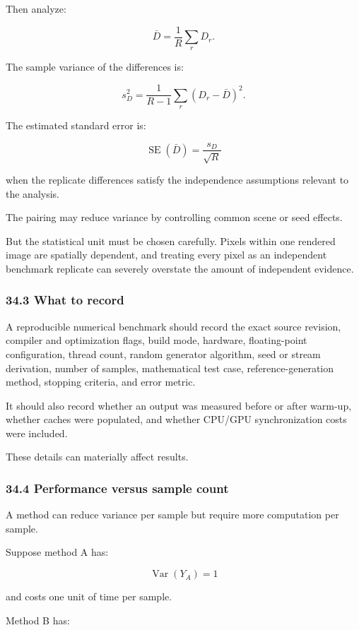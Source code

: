 Then analyze:

\[ \bar D= \frac1R\sum_rD_r. \]

The sample variance of the differences is:

\[ s_D^2= \frac1{R-1}\sum_r(D_r-\bar D)^2. \]

The estimated standard error is:

\[ \boxed{ \operatorname{SE}(\bar D) = \frac{s_D}{\sqrt R} } \]

when the replicate differences satisfy the independence assumptions relevant to the analysis.

The pairing may reduce variance by controlling common scene or seed effects.

But the statistical unit must be chosen carefully. Pixels within one rendered image are spatially dependent, and treating every pixel as an independent benchmark replicate can severely overstate the amount of independent evidence.

\subsubsection{34.3 What to record}\label{what-to-record}

A reproducible numerical benchmark should record the exact source revision, compiler and optimization flags, build mode, hardware, floating-point configuration, thread count, random generator algorithm, seed or stream derivation, number of samples, mathematical test case, reference-generation method, stopping criteria, and error metric.

It should also record whether an output was measured before or after warm-up, whether caches were populated, and whether CPU/GPU synchronization costs were included.

These details can materially affect results.

\subsubsection{34.4 Performance versus sample count}\label{performance-versus-sample-count}

A method can reduce variance per sample but require more computation per sample.

Suppose method A has:

\[ \operatorname{Var}(Y_A)=1 \]

and costs one unit of time per sample.

Method B has:

